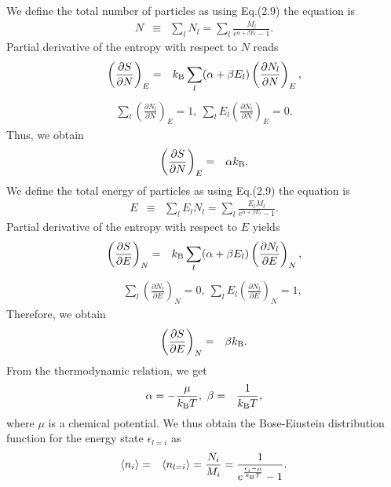 \documentclass[12pt,a4paper]{report}
\newcommand{\kb} {k_{\rm B}}				            %
\begin{document}
We define the total number of particles as using Eq.(2.9) the equation is
\begin{eqnarray}
N & \equiv & \sum_l N_l = \sum_l \frac{M_l}{e^{\alpha + \beta E_l} -1}.
\end{eqnarray}
Partial derivative of the entropy with respect to $N$ reads
\begin{eqnarray}
\left( \frac{\partial S}{\partial N} \right)_E & = &
\kb \sum_l (\alpha + \beta E_l) \left( \frac{\partial N_l}{\partial N} \right)_E,
\end{eqnarray}
\begin{eqnarray}
\sum_l \left( \frac{\partial N_l}{\partial N} \right)_E = 1,
\ \sum_l E_l \left( \frac{\partial N_l}{\partial N} \right)_E = 0.
\end{eqnarray}
Thus, we obtain
\begin{eqnarray}
\left( \frac{\partial S}{\partial N} \right)_E & = & \alpha \kb.
\end{eqnarray}
We define the total energy of particles as using Eq.(2.9) the equation is
\begin{eqnarray}
E & \equiv & \sum_l E_l N_l = \sum_l \frac{E_l M_l}{e^{\alpha + \beta E_l} -1}.
\end{eqnarray}
Partial derivative of the entropy with respect to $E$ yields
\begin{eqnarray}
\left( \frac{\partial S}{\partial E} \right)_N & = &
\kb \sum_l (\alpha + \beta E_l) \left( \frac{\partial N_l}{\partial E} \right)_N,
\end{eqnarray}
\begin{eqnarray}
& & \sum_l \left( \frac{\partial N_l}{\partial E} \right)_N = 0,
\ \sum_l E_l \left( \frac{\partial N_l}{\partial E} \right)_N = 1,
\end{eqnarray}
Therefore, we obtain
\begin{eqnarray}
\left( \frac{\partial S}{\partial E} \right)_N & = & \beta \kb.
\end{eqnarray}
From the thermodynamic relation, we get
\begin{eqnarray}
\alpha = - \frac{\mu}{\kb T}
, \ \beta & = & \frac{1}{\kb T},
\end{eqnarray}
where $\mu$ is a chemical potential. We thus obtain the Bose-Einstein distribution function for the energy state $\epsilon_{l=i}$ as
\begin{eqnarray}
\langle n_i \rangle & = & \langle n_{l=i} \rangle = \frac{N_i}{M_i} = \frac{1}{e^{\frac{\epsilon_i - \mu}{\kb T}} - 1}.
\end{eqnarray}
\end{document}
